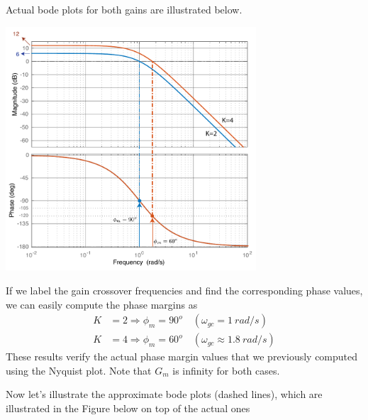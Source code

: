 \documentclass[twoside]{article}
\begin{document}
Actual bode plots for both gains are illustrated
below. 

\begin{center}
\begin{minipage}[h]{\linewidth}
    \begin{center}
      \includegraphics[width=0.7\textwidth]{marginactual}
    \end{center}
\end{minipage}
\end{center}

If we label the gain crossover frequencies and find the 
corresponding phase values, we can easily compute the phase 
margins as
%
\begin{align*}
  K &= 2 \Rightarrow \phi_m = 90^o \quad (\omega_{gc} = 1 \ rad/s)
  \\
  K &= 4 \Rightarrow \phi_m = 60^o \quad (\omega_{gc} \approx 1.8 \ rad/s)
\end{align*}
%
These results verify the actual phase margin values that we previously computed
using the Nyquist plot. Note that $G_m$ is infinity for both cases.

Now let's illustrate the approximate bode plots (dashed lines),
which are illustrated in the Figure below on top of the actual ones
\end{document}
